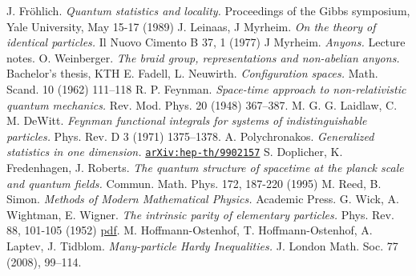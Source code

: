 \begin{thebibliography}{99}
   J. Fröhlich. \textit{Quantum statistics and locality.} Proceedings of the Gibbs symposium, Yale University, May 15-17 (1989)
   J. Leinaas, J Myrheim. \textit{On the theory of identical particles.} Il Nuovo Cimento B 37, 1 (1977)
   J Myrheim. \textit{Anyons.} Lecture notes.
   O. Weinberger. \textit{The braid group, representations and non-abelian anyons.} Bachelor's thesis, KTH
   E. Fadell, L. Neuwirth. \textit{Configuration spaces.} Math. Scand. 10 (1962) 111–118
   R. P. Feynman. \textit{Space-time approach to non-relativistic quantum mechanics.} Rev. Mod. Phys. 20 (1948) 367–387.
   M. G. G. Laidlaw, C. M. DeWitt. \textit{Feynman functional integrals for systems of indistinguishable particles.} Phys. Rev. D 3 (1971) 1375–1378.
   A. Polychronakos. \textit{Generalized statistics in one dimension.} \href{https://arxiv.org/abs/hep-th/9902157}{\texttt{arXiv:hep-th/9902157}}
   S. Doplicher, K. Fredenhagen, J. Roberts. \textit{The quantum structure of spacetime at the planck scale and quantum fields.} Commun. Math. Phys. 172, 187-220 (1995)
   M. Reed, B. Simon. \textit{Methods of Modern Mathematical Physics.} Academic Press.
   G. Wick, A. Wightman, E. Wigner. \textit{The intrinsic parity of elementary particles.} Phys. Rev. 88, 101-105 (1952) \href{http://dieumsnh.qfb.umich.mx/archivoshistoricosmq/ModernaHist/Wick.pdf}{pdf}.
   M. Hoffmann-Ostenhof, T. Hoffmann-Ostenhof, A. Laptev, J. Tidblom. \textit{Many-particle Hardy Inequalities.} J. London Math. Soc. 77 (2008), 99–114.


\end{thebibliography}
